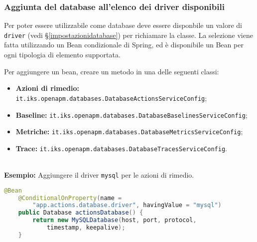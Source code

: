 		\subsubsection{Aggiunta del database all'elenco dei driver disponibili}

		Per poter essere utilizzabile come database deve essere disponbile un valore di \lstinline{driver} 
		(vedi §\ref{impostazionidatabase}) per richiamare la classe.
		La selezione viene fatta utilizzando un Bean condizionale di Spring, ed è disponibile un 
		Bean per ogni tipologia di elemento supportata.

		Per aggiungere un bean, creare un metodo in una delle seguenti classi:
		\begin{itemize}
		\item \textbf{Azioni di rimedio:} \lstinline{it.iks.openapm.databases.DatabaseActionsServiceConfig};
		\item \textbf{Baseline:} \lstinline{it.iks.openapm.databases.DatabaseBaselinesServiceConfig};
		\item \textbf{Metriche:} \lstinline{it.iks.openapm.databases.DatabaseMetricsServiceConfig};
		\item \textbf{Trace:} \lstinline{it.iks.openapm.databases.DatabaseTracesServiceConfig}.
		\end{itemize}\\
		
		\textbf{Esempio:}
		Aggiungere il driver \lstinline{mysql} per le azioni di rimedio.

		\begin{lstlisting}[language=Java]
	@Bean
	@ConditionalOnProperty(name = 
		"app.actions.database.driver", havingValue = "mysql")
	public Database actionsDatabase() {
		return new MySQLDatabase(host, port, protocol,
			timestamp, keepalive);
	}
		\end{lstlisting}
